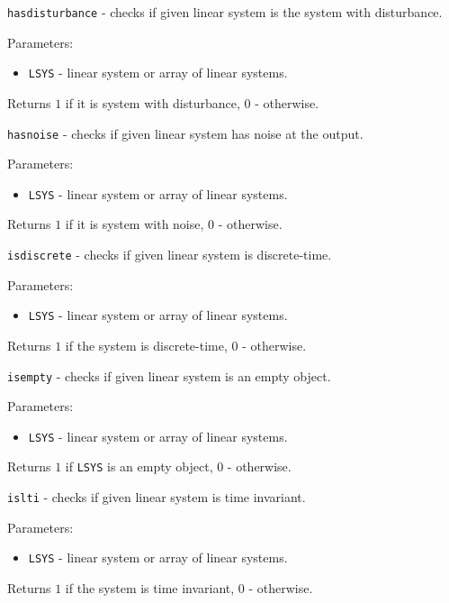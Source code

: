 \documentclass{report}
\begin{document}
\newpage

{\Large {\tt hasdisturbance}} - checks if given linear system is the system
with disturbance.

Parameters:
\begin{itemize}
\item {\tt LSYS} - linear system or array of linear systems.
\end{itemize}

Returns $1$ if it is system with disturbance, $0$ - otherwise.

\newpage

{\Large {\tt hasnoise}} - checks if given linear system has noise at the
output.

Parameters:
\begin{itemize}
\item {\tt LSYS} - linear system or array of linear systems.
\end{itemize}

Returns $1$ if it is system with noise, $0$ - otherwise.

\newpage

{\Large {\tt isdiscrete}} - checks if given linear system is discrete-time.

Parameters:
\begin{itemize}
\item {\tt LSYS} - linear system or array of linear systems.
\end{itemize}

Returns $1$ if the system is discrete-time, $0$ - otherwise.

\newpage

{\Large {\tt isempty}} - checks if given linear system is an empty object.

Parameters:
\begin{itemize}
\item {\tt LSYS} - linear system or array of linear systems.
\end{itemize}

Returns $1$ if {\tt LSYS} is an empty object, $0$ - otherwise.

\newpage

{\Large {\tt islti}} - checks if given linear system is time invariant.

Parameters:
\begin{itemize}
\item {\tt LSYS} - linear system or array of linear systems.
\end{itemize}

Returns $1$ if the system is time invariant, $0$ - otherwise.
\end{document}
